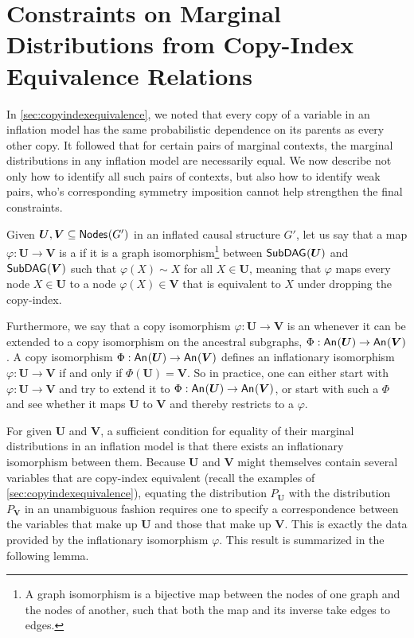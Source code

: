 \documentclass[aps,english,10pt,superscriptaddress,onecolumn,twoside,longbibliography,pra,floatfix,fleqn,nofootinbib]{revtex4-1}
\newcommand*{\tblue}[1]{{\color{MidnightBlue}{\textbf{#1}}}}
\theoremstyle{definition}
\newcounter{example}[section]
\newcommand{\An}[2][]{{\mathsf{An}_{#1}}\parenths{#2}}
\newcommand{\SmallNamedFunction}[3][]{\operatorname{\mathsf{#2}}_{#1}\parenths{#3}}
\newcommand{\subgraph}[2][]{\SmallNamedFunction[#1]{SubDAG}{#2}}
\newcommand{\nodes}[1]{\SmallNamedFunction{Nodes}{#1}}
\DeclarePairedDelimiter{\parenths}{\lparen}{\rparen}
\begin{document}
\section{Constraints on Marginal Distributions from Copy-Index Equivalence Relations}\label{sec:coincidingdetails}

In \cref{sec:copyindexequivalence}, we noted that every copy of a variable in an inflation model has the same probabilistic dependence on its parents as every other copy. It followed that for certain pairs of marginal contexts, the marginal distributions in any inflation model are necessarily equal. We now describe not only how to identify all such pairs of contexts, but also how to identify weak pairs, who's corresponding symmetry imposition cannot help strengthen the final constraints.

Given $\bm{U},\bm{V}\subseteq\nodes{G'}$ in an inflated causal structure $G'$, let us say that a map $\varphi:\bm{U}\to\bm{V}$ is a \tblue{copy isomorphism} if it is a graph isomorphism\footnote{A graph isomorphism is a bijective map between the nodes of one graph and the nodes of another, such that both the map and its inverse take edges to edges.} between $\subgraph{\bm{U}}$ and $\subgraph{\bm{V}}$ such that $\varphi(X)\sim X$ for all $X\in\bm{U}$, meaning that $\varphi$ maps every node $X\in\bm{U}$ to a node $\varphi(X)\in\bm{V}$ that is equivalent to $X$ under dropping the copy-index.

Furthermore, we say that a copy isomorphism $\varphi : \bm{U}\to\bm{V}$ is an \tblue{inflationary isomorphism} whenever it can be extended to a copy isomorphism on the ancestral subgraphs, $\Phi : \An{\bm{U}}\to\An{\bm{V}}$. 
A copy isomorphism $\Phi: \An{\bm{U}}\to\An{\bm{V}}$ defines an inflationary isomorphism $\varphi:\bm{U}\to\bm{V}$ if and only if $\Phi(\bm{U}) = \bm{V}$.
So in practice, one can either start with $\varphi : \bm{U}\to\bm{V}$ and try to extend it to $\Phi : \An{\bm{U}}\to\An{\bm{V}}$, or start with such a $\Phi$ and see whether it maps $\bm{U}$ to $\bm{V}$ and thereby restricts to a $\varphi$.

For given $\bm{U}$ and $\bm{V}$, a sufficient condition for equality of their marginal distributions in an inflation model is that there exists an inflationary isomorphism between them.  Because $\bm{U}$ and $\bm{V}$ might themselves contain several variables that are copy-index equivalent (recall the examples of \cref{sec:copyindexequivalence}), equating the distribution $P_{\bm{U}}$ with the distribution $P_{\bm{V}}$ in an unambiguous fashion requires one to specify a correspondence between the variables that make up $\bm{U}$ and those that make up $\bm{V}$. This is exactly the data provided by the inflationary isomorphism $\varphi$.  This result is summarized in the following lemma.
\end{document}
